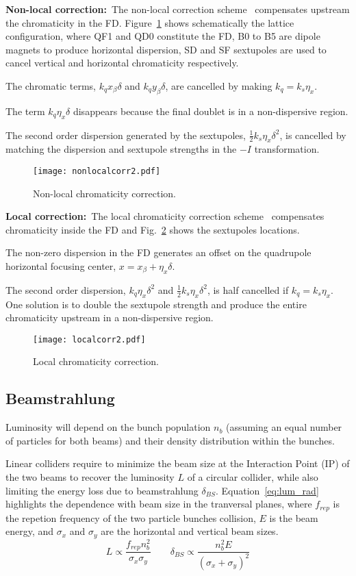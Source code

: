 %
\textbf{Non-local correction:}~The non-local correction scheme~\cite{Brown:1988} compensates upstream the chromaticity in the FD. Figure~\ref{f-Non-local} shows schematically the lattice configuration, where QF1 and QD0 constitute the FD, B0 to B5 are dipole magnets to produce horizontal dispersion, SD and SF sextupoles are used to cancel vertical and horizontal chromaticity respectively.\par
The chromatic terms, $k_q x_\beta\delta$ and $k_q y_\beta\delta$, are cancelled by making $k_q=k_s\eta_x$.\par
The term $k_q\eta_x\delta$ disappears because the final doublet is in a non-dispersive region.\par
The second order dispersion generated by the sextupoles, $\frac{1}{2}k_s\eta_x\delta^2$, is cancelled by matching the dispersion and sextupole strengths in the $-I$ transformation.
\begin{figure}[h]
   \centering
   \texttt{[image: nonlocalcorr2.pdf]}
   \caption{Non-local chromaticity correction.}
   \label{f-Non-local}
\end{figure}\par
\textbf{Local correction:}~The local chromaticity correction scheme~\cite{Raimondi:2000} compensates chromaticity inside the FD and Fig.~\ref{f-local} shows the sextupoles locations.\par
The non-zero dispersion in the FD generates an offset on the quadrupole horizontal focusing center, $x=x_\beta+\eta_x\delta$.\par
The second order dispersion, $k_q\eta_x\delta^2$ and $\frac{1}{2}k_s\eta_x\delta^2$, is half cancelled if $k_q=k_s\eta_x$. One solution is to double the sextupole strength and produce the entire chromaticity upstream in a non-dispersive region.\par
\begin{figure}[!htb]
   \centering
   \texttt{[image: localcorr2.pdf]}
   \caption{Local chromaticity correction.}
   \label{f-local}
\end{figure}
\subsection{Beamstrahlung}\label{s:beastr}
Luminosity will depend on the bunch population 	$n_b$ (assuming an equal number of particles for both beams) and their density distribution within the bunches.\par 
Linear colliders require to minimize the beam size at the Interaction Point (IP) of the two beams to recover the luminosity $L$ of a circular collider, while also limiting the energy loss due to beamstrahlung $\delta_{BS}$. Equation~\ref{eq:lum_rad} highlights the dependence with beam size in the tranversal planes, where $f_{rep}$ is the repetion frequency of the two particle bunches collision, $E$ is the beam energy, and $\sigma_x$ and $\sigma_y$ are the horizontal and vertical beam sizes.
\begin{equation}
 L \propto \frac{f_{rep}n_b^2}{\sigma_x\sigma_y}\qquad\delta_{BS}\propto\frac{n_b^2E}{(\sigma_x+\sigma_y)^2}\label{eq:lum_rad}
\end{equation}

